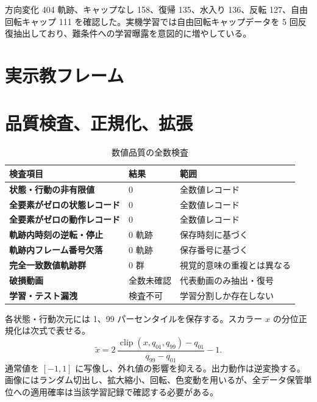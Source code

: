 方向変化 404 軌跡、キャップなし 158、復帰 135、水入り 136、反転 127、自由回転キャップ 111 を確認した。実機学習では自由回転キャップデータを 5 回反復抽出しており、難条件への学習曝露を意図的に増やしている。


\section{実示教フレーム}


\section{品質検査、正規化、拡張}

\begin{table}[H]
\centering
\small
\caption{数値品質の全数検査}
\begin{tabularx}{\textwidth}{>{\japanesesans\bfseries}p{42mm}p{28mm}X}
\toprule
検査項目 & 結果 & 範囲\\
\midrule
状態・行動の非有限値 & 0 & 全数値レコード\\
全要素がゼロの状態レコード & 0 & 全数値レコード\\
全要素がゼロの動作レコード & 0 & 全数値レコード\\
軌跡内時刻の逆転・停止 & 0 軌跡 & 保存時刻に基づく\\
軌跡内フレーム番号欠落 & 0 軌跡 & 保存番号に基づく\\
完全一致数値軌跡群 & 0 群 & 視覚的意味の重複とは異なる\\
破損動画 & 全数未確認 & 代表動画のみ抽出・復号\\
学習・テスト漏洩 & 検査不可 & 学習分割しか存在しない\\
\bottomrule
\end{tabularx}
\end{table}

各状態・行動次元には 1、99 パーセンタイルを保存する。スカラー $x$ の分位正規化は次式で表せる。
\[
\tilde{x}=2\,\frac{\operatorname{clip}(x,q_{01},q_{99})-q_{01}}
{q_{99}-q_{01}}-1.
\]
通常値を $[-1,1]$ に写像し、外れ値の影響を抑える。出力動作は逆変換する。 画像にはランダム切出し、拡大縮小、回転、色変動を用いるが、全データ保管単位への適用確率は当該学習記録で確認する必要がある。

